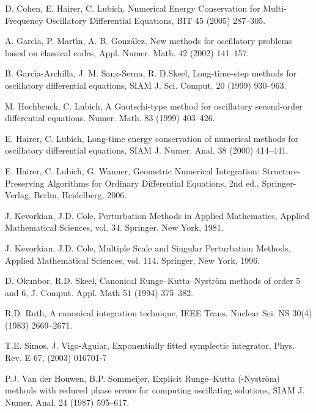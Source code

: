 \documentclass{article}
\begin{document}
\begin{thebibliography}{99}
\setlength{\itemsep}{0.05cm}

 D. Cohen, E. Hairer,  C. Lubich,
Numerical Energy Conservation for Multi-Frequency Oscillatory
Differential  Equations, BIT 45 (2005) 287--305.

 A. Garc\'{\i}a, P. Mart\'{\i}n,  A. B. Gonz\'{a}lez,   New methods
for oscillatory problems based on classical codes, Appl. Numer.
Math.   42  (2002) 141--157.

B. Garc\'{\i}a-Archilla, J. M. Sanz-Serna, R. D.Skeel,
Long-time-step methods for oscillatory differential equations, SIAM
J. Sci. Comput.   20 (1999) 930--963.

 M. Hochbruck, C. Lubich,
  A Gautschi-type method for oscillatory second-order differential
  equations. Numer. Math. 83 (1999) 403--426.

 E. Hairer,  C. Lubich,
  Long-time energy conservation of numerical methods for oscillatory differential
equations, SIAM J. Numer. Anal.   38 (2000) 414--441.

E. Hairer, C. Lubich,  G. Wanner,
  Geometric Numerical Integration: Structure-Preserving Algorithms for Ordinary
Differential Equations,    2nd ed., Springer-Verlag, Berlin,
Heidelberg,  2006.

J. Kevorkian, J.D. Cole, Perturbation Methods in Applied
Mathematics, Applied Mathematical Sciences, vol. 34. Springer, New
York, 1981.

J. Kevorkian, J.D. Cole, Multiple Scale and Singular Perturbation
Methods, Applied Mathematical Sciences, vol. 114. Springer, New
York, 1996.

D. Okunbor, R.D. Skeel, Canonical Runge--Kutta--Nystr\"{o}m
 methods of order 5 and 6, J. Comput. Appl. Math 51 (1994) 375--382.

R.D. Ruth, A canonical integration technique, IEEE Trans. Nuclear
Sci. NS 30(4) (1983) 2669--2671.



T.E. Simos, J. Vigo-Aguiar, Exponentially fitted symplectic
integrator, Phys. Rev. E 67,  (2003) 016701-7

 P.J. Van der Houwen,  B.P. Sommeijer,  Explicit
Runge--Kutta (-Nystr\"{o}m) methods with reduced phase errors for
computing oscillating solutions, SIAM J. Numer. Anal. 24 (1987)
  595--617.




\end{thebibliography}
\end{document}
